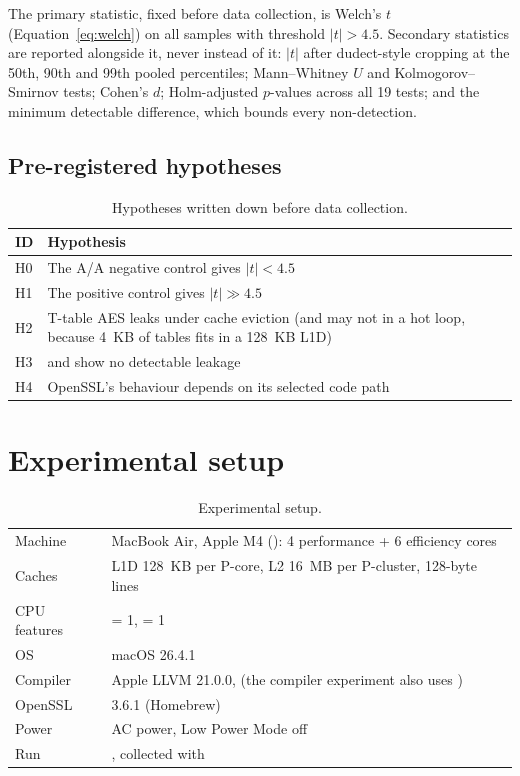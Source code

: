 The primary statistic, fixed before data collection, is Welch's $t$ (Equation~\ref{eq:welch}) on all samples with threshold $\lvert t\rvert > 4.5$. Secondary statistics are reported alongside it, never instead of it: $\lvert t\rvert$ after dudect-style cropping at the 50th, 90th and 99th pooled percentiles; Mann--Whitney $U$ and Kolmogorov--Smirnov tests; Cohen's $d$; Holm-adjusted $p$-values across all 19 tests; and the minimum detectable difference, which bounds every non-detection.

\subsection{Pre-registered hypotheses}

\begin{table}[htbp]
\centering
\small
\renewcommand{\arraystretch}{1.15}
\begin{tabular}{@{}P{0.07\textwidth}P{0.83\textwidth}@{}}
\toprule
ID & Hypothesis \\
\midrule
H0 & The A/A negative control gives $\lvert t\rvert < 4.5$ \\
H1 & The positive control gives $\lvert t\rvert \gg 4.5$ \\
H2 & T-table AES leaks under cache eviction (and may not in a hot loop, because 4~KB of tables fits in a 128~KB L1D) \\
H3 &  and  show no detectable leakage \\
H4 & OpenSSL's behaviour depends on its selected code path \\
\bottomrule
\end{tabular}
\caption{Hypotheses written down before data collection.}
\label{tab:hyp}
\end{table}

\section{Experimental setup}

\begin{table}[htbp]
\centering
\small
\renewcommand{\arraystretch}{1.15}
\begin{tabular}{@{}P{0.18\textwidth}P{0.72\textwidth}@{}}
\toprule
Machine & MacBook Air, Apple M4 (): 4 performance + 6 efficiency cores \\
Caches & L1D 128~KB per P-core, L2 16~MB per P-cluster, 128-byte lines \\
CPU features &  = 1,  = 1 \\
OS & macOS 26.4.1 \\
Compiler & Apple LLVM 21.0.0,  (the compiler experiment also uses ) \\
OpenSSL & 3.6.1 (Homebrew) \\
Power & AC power, Low Power Mode off \\
Run & , collected with  \\
\bottomrule
\end{tabular}
\caption{Experimental setup.}
\label{tab:setup}
\end{table}

